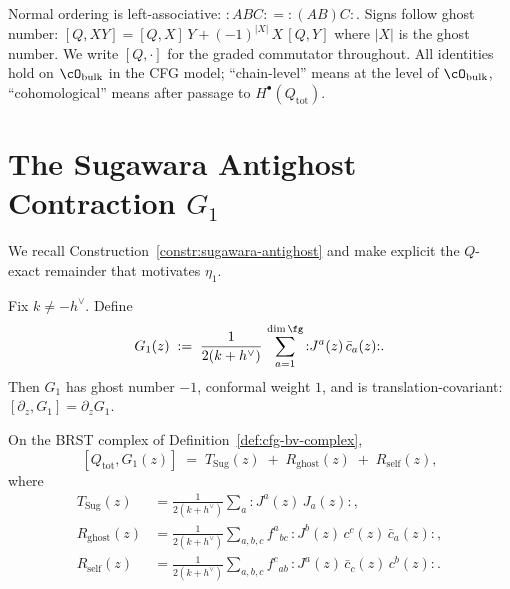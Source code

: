 \begin{convention}
\label{conv:topol-platonic}
Normal ordering is left-associative:
${:}ABC{:} = {:}(AB)C{:}$. Signs follow ghost number:
$[Q, XY] = [Q,X]\,Y + (-1)^{|X|}\,X\,[Q,Y]$ where $|X|$ is the
ghost number. We write $[Q, \cdot]$ for the graded
commutator throughout. All identities hold on $\cO_{\mathrm{bulk}}$
in the CFG model; ``chain-level'' means at the level of $\cO_{\mathrm{bulk}}$, ``cohomological'' means after passage to $H^\bullet(Q_{\mathrm{tot}})$.
\end{convention}

\section{The Sugawara Antighost Contraction \texorpdfstring{$G_1$}{G1}}
\label{sec:G1}

We recall Construction~\ref{constr:sugawara-antighost} and make
explicit the $Q$-exact remainder that motivates $\eta_1$.

\begin{construction}
\label{constr:G1-recall}
Fix $k \ne -h^\vee$. Define
\begin{equation}\label{eq:G1}
 G_1(z) \;:=\; \frac{1}{2(k+h^\vee)}\,
 \sum_{a=1}^{\dim\fg} {:}J^a(z)\,\bar c_a(z){:}.
\end{equation}
Then $G_1$ has ghost number $-1$, conformal weight $1$, and is
translation-covariant: $[\partial_z, G_1] = \partial_z G_1$.
\end{construction}

\begin{proposition}
\label{prop:QG1-remainder}
\ClaimStatusProvedHere
On the BRST complex of
Definition~\ref{def:cfg-bv-complex},
\begin{equation}\label{eq:QG1-decomposition}
 [Q_{\mathrm{tot}}, G_1(z)]
 \;=\; T_{\mathrm{Sug}}(z) \;+\;
 R_{\mathrm{ghost}}(z) \;+\; R_{\mathrm{self}}(z),
\end{equation}
where
\begin{align}
 T_{\mathrm{Sug}}(z)
 &= \frac{1}{2(k+h^\vee)}\sum_a {:}J^a(z)\,J_a(z){:},
 \label{eq:T-sug}\\
 R_{\mathrm{ghost}}(z)
 &= \frac{1}{2(k+h^\vee)}\sum_{a,b,c}
 f^a{}_{bc}\,{:}J^b(z)\,c^c(z)\,\bar c_a(z){:},
 \label{eq:R-ghost}\\
 R_{\mathrm{self}}(z)
 &= \frac{1}{2(k+h^\vee)}\sum_{a,b,c}
 f^c{}_{ab}\,{:}J^a(z)\,\bar c_c(z)\,c^b(z){:}.
 \label{eq:R-self}
\end{align}
\end{proposition}


